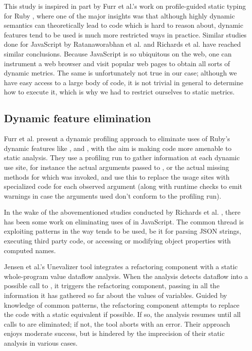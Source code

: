This study is inspired in part by Furr et al.'s work on profile-guided static
typing for Ruby \cite{ProfileGuidedStaticTyping}, where one of the major
insights was that although highly dynamic semantics can theoretically lead to
code which is hard to reason about, dynamic features tend to be used is much
more restricted ways in practice. Similar studies done for JavaScript by
Ratanaworabhan et al. \cite{JSMeter} and Richards et al.
\cite{TheEvalThatMenDo,DynamicBehaviorJavaScript} have reached similar
conclusions. Because JavaScript is so ubiquitous on the web, one can instrument
a web browser and visit popular web pages to obtain all sorts of dynamic
metrics. The same is unfortunately not true in our case; although we have easy
access to a large body of \matlab code, it is not trivial in general to
determine how to execute it, which is why we had to restrict ourselves to
static metrics.

\subsection{Dynamic feature elimination}

Furr et al. \cite{ProfileGuidedStaticTyping} present a dynamic profiling
approach to eliminate uses of Ruby's dynamic features like ,
 and , with the aim is making code more
amenable to static analysis. They use a profiling run to gather information at
each dynamic use site, for instance the actual arguments passed to ,
or the actual missing methods for which  was invoked, and
use this to replace the usage sites with specialized code for each observed
argument (along with runtime checks to emit warnings in case the arguments used
don't conform to the profiling run).

In the wake of the abovementioned studies conducted by Richards et al.
\cite{DynamicBehaviorJavaScript, TheEvalThatMenDo}, there has been some work on
eliminating uses of  in JavaScript. The common thread is exploiting
patterns in the way  tends to be used, be it for parsing JSON
strings, executing third party code, or accessing or modifying object
properties with computed names.

Jensen et al.'s Unevalizer tool \cite{RemedyingTheEvalThatMenDo} integrates a
refactoring component with a static whole-program value dataflow analysis. When
the analysis detects dataflow into a possible call to , it triggers
the refactoring component, passing in all the information it has gathered so
far about the values of variables. Guided by knowledge of common patterns, the
refactoring component attempts to replace the code with a static equivalent if
possible. If so, the analysis resumes until all calls to  are
eliminated; if not, the tool aborts with an error. Their approach enjoys
moderate success, but is hindered by the imprecision of their static analysis
in various cases.

